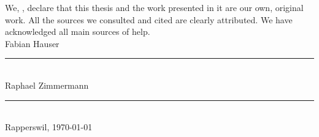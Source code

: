 
\begin{declaration}
\addchaptertocentry{\authorshipname} %
\noindent We, \authorname, declare that this thesis and the work presented in it are our own, original work.  All the sources we consulted and cited are clearly attributed. We have acknowledged all main sources of help. \\

\noindent Fabian Hauser\\[2em]
\rule[0.5em]{25em}{0.5pt}\\ %
\noindent Raphael Zimmermann\\[2em]
\rule[0.5em]{25em}{0.5pt}\\ %
\noindent Rapperswil, \today
\end{declaration}

\cleardoublepage



  
